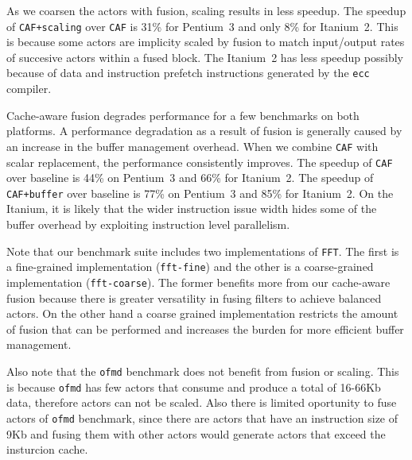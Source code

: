 As we coarsen the actors with fusion, scaling results in less speedup.
The speedup of \texttt{CAF+scaling} over \texttt{CAF} is
31\% for Pentium~3 and only 8\% for Itanium~2. This is because some actors
are implicity scaled by fusion to match input/output rates of succesive 
actors within a fused block. The Itanium~2 has less speedup possibly
because of data and instruction prefetch instructions generated by the 
\texttt{ecc} compiler.




Cache-aware fusion degrades performance for a few benchmarks on both platforms.
A performance degradation as a result of fusion is generally caused by
an increase in the buffer management overhead. When
we combine \texttt{CAF} with scalar replacement, the
performance consistently improves. 
The speedup of \texttt{CAF} over baseline is 44\% on Pentium~3
and 66\% for Itanium~2. 
The speedup of \texttt{CAF+buffer} over baseline is 77\% on Pentium~3
and 85\% for Itanium~2. 
On the Itanium, it is likely that
the wider instruction issue width hides some of the buffer overhead by
exploiting instruction level parallelism.

Note that our benchmark suite
includes two implementations of \texttt{FFT}. The first is a
fine-grained implementation (\texttt{fft-fine}) and the other is a
coarse-grained implementation (\texttt{fft-coarse}). The former
benefits more from our cache-aware fusion because there is greater
versatility in fusing filters to achieve balanced actors. On the other hand
a coarse grained implementation restricts the amount of fusion that
can be performed and increases the burden for more efficient buffer
management. 

Also note that the \texttt{ofmd} benchmark does not benefit from fusion or
scaling. This is because  \texttt{ofmd} has few actors that consume 
and produce a total of 16-66Kb data, therefore actors can not be scaled.
Also there is limited oportunity to fuse actors of \texttt{ofmd} 
benchmark, since there are actors that have an instruction size of 9Kb 
and fusing them with other actors would generate actors that exceed the
insturcion cache.

